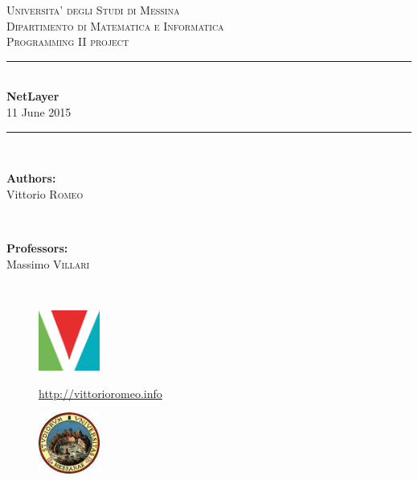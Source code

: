 \documentclass[12pt]{report}
\newcommand{\+}{\discretionary{\mbox{\scriptsize$\hookleftarrow$}}{}{}}
\newcommand{\HRule}{\rule{\linewidth}{0.5mm}}
\renewcommand\emph{\textbf}
\begin{document}
\begin{titlepage}

    \center

    \textsc{\LARGE Universita' degli Studi di Messina}\\[0.1cm]
    \textsc{\Large Dipartimento di Matematica e Informatica}\\[0.5cm]
    \textsc{\Large Programming II project}\\[0.5cm]

    \HRule \\[0.4cm]
    { \huge \bfseries NetLayer}\\[0.1cm]

    {\large 11 June 2015}
    \HRule \\[1.5cm]

    \begin{minipage}{0.4\textwidth}
    \begin{flushleft} \large
    \emph{Authors:}\\
    Vittorio \textsc{Romeo}
    \end{flushleft}
    \end{minipage}
    ~
    \begin{minipage}{0.4\textwidth}
    \begin{flushright} \large
    \emph{Professors:} \\
    Massimo \textsc{Villari}


    \end{flushright}
    \end{minipage}\\[4cm]

    \vfill


    \begin{minipage}{\linewidth}
        \centering
        \begin{minipage}{0.35\linewidth}
            \begin{figure}[H]
                \center
                \includegraphics[width=2cm, height=2cm]{logovee}

                \url{http://vittorioromeo.info}
            \end{figure}
        \end{minipage}
        \hspace{0.27\linewidth}
        \begin{minipage}{0.35\linewidth}
            \begin{figure}[H]
                \center
                \includegraphics[width=2cm, height=2cm]{logounime}


\end{figure}
\end{minipage}
\end{minipage}
\end{titlepage}
\end{document}
